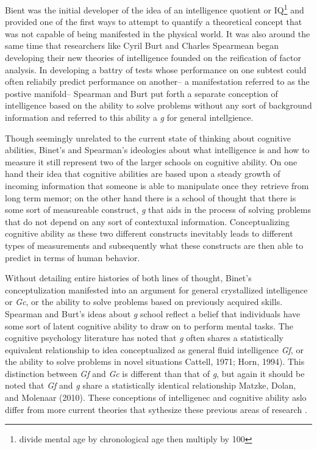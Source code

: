 \documentclass[]{book}
\let\rmarkdownfootnote\footnote%
\def\footnote{\protect\rmarkdownfootnote}
\theoremstyle{definition}
\theoremstyle{definition}
\theoremstyle{definition}
\theoremstyle{remark}
\begin{document}
Bient was the initial developer of the idea of an intelligence quotient
or IQ\footnote{divide mental age by chronological age then multiply by
  100} and provided one of the first ways to attempt to quantify a
theoretical concept that was not capable of being manifested in the
physical world. It was also around the same time that researchers like
Cyril Burt and Charles Spearmean began developing their new theories of
intelligence founded on the reification of factor analysis. In
developing a battry of tests whose performance on one subtest could
often reliabily predict performance on another-- a manifestation
referred to as the postive manifold-- Spearman and Burt put forth a
separate conception of intelligence based on the ability to solve
problems without any sort of background information and referred to this
ability a \emph{g} for general intellgience.

Though seemingly unrelated to the current state of thinking about
cognitive abilities, Binet's and Spearman's ideologies about what
intelligence is and how to measure it still represent two of the larger
schools on cognitive ability. On one hand their idea that cognitive
abilities are based upon a steady growth of incoming information that
someone is able to manipulate once they retrieve from long term memor;
on the other hand there is a school of thought that there is some sort
of measureable construct, \emph{g} that aids in the process of solving
problems that do not depend on any sort of contextuxal information.
Conceptualizing cognitive ability as these two different constructs
inevitably leads to different types of measurements and subsequently
what these constructs are then able to predict in terms of human
behavior.

Without detailing entire histories of both lines of thought, Binet's
conceptulization manifested into an argument for general crystallized
intelligence or \emph{Gc}, or the ability to solve problems based on
previously acquired skills. Spearman and Burt's ideas about \emph{g}
school reflect a belief that individuals have some sort of latent
cognitive ability to draw on to perform mental tasks. The cognitive
psychology literature has noted that \emph{g} often shares a
statistically equivalent relationship to idea conceptualized as general
fluid intelligence \emph{Gf}, or the ability to solve problems in novel
situations Cattell, 1971; Horn, 1994). This distinction between
\emph{Gf} and \emph{Gc} is different than that of \emph{g}, but again it
should be noted that \emph{Gf} and \emph{g} share a statistically
identical relationship Matzke, Dolan, and Molenaar (2010). These
conceptions of intelligenec and cognitive ability aslo differ from more
current theories that sythesize these previous areas of research
\citep{kovacsProcessOverlapTheory2016}.
\end{document}
